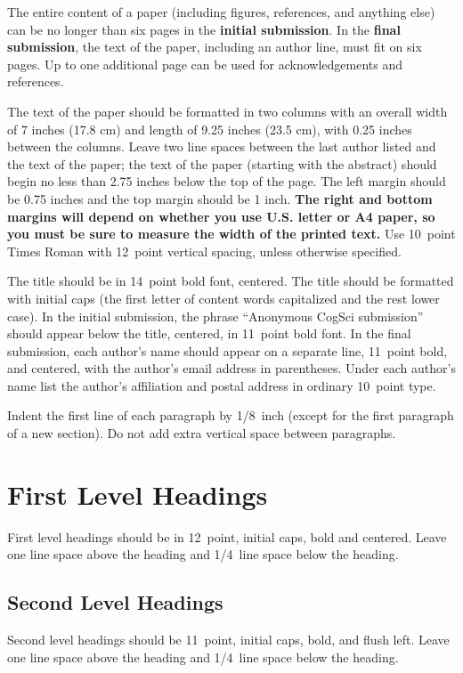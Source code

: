 \documentclass[10pt,letterpaper]{article}
\begin{document}
The entire content of a paper (including figures, references, and anything else) can be no longer than six pages in the \textbf{initial submission}. In the \textbf{final submission}, the text of the paper, including an author line, must fit on six pages. Up to one additional page can be used for acknowledgements and references.

The text of the paper should be formatted in two columns with an
overall width of 7 inches (17.8 cm) and length of 9.25 inches (23.5
cm), with 0.25 inches between the columns. Leave two line spaces
between the last author listed and the text of the paper; the text of
the paper (starting with the abstract) should begin no less than 2.75 inches below the top of the
page. The left margin should be 0.75 inches and the top margin should
be 1 inch.  \textbf{The right and bottom margins will depend on
  whether you use U.S. letter or A4 paper, so you must be sure to
  measure the width of the printed text.} Use 10~point Times Roman
with 12~point vertical spacing, unless otherwise specified.

The title should be in 14~point bold font, centered. The title should
be formatted with initial caps (the first letter of content words
capitalized and the rest lower case). In the initial submission, the
phrase ``Anonymous CogSci submission'' should appear below the title,
centered, in 11~point bold font.  In the final submission, each
author's name should appear on a separate line, 11~point bold, and
centered, with the author's email address in parentheses. Under each
author's name list the author's affiliation and postal address in
ordinary 10~point type.

Indent the first line of each paragraph by 1/8~inch (except for the
first paragraph of a new section). Do not add extra vertical space
between paragraphs.


\section{First Level Headings}

First level headings should be in 12~point, initial caps, bold and
centered. Leave one line space above the heading and 1/4~line space
below the heading.


\subsection{Second Level Headings}

Second level headings should be 11~point, initial caps, bold, and
flush left. Leave one line space above the heading and 1/4~line
space below the heading.
\end{document}
